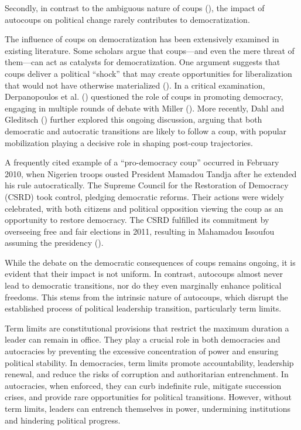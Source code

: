 \documentclass[
  12pt,
]{report}
\begin{document}
Secondly, in contrast to the ambiguous nature of coups
(), the impact of
autocoups on political change rarely contributes to democratization.

The influence of coups on democratization has been extensively examined
in existing literature. Some scholars argue that coups---and even the
mere threat of them---can act as catalysts for democratization. One
argument suggests that coups deliver a political ``shock'' that may
create opportunities for liberalization that would not have otherwise
materialized (). In
a critical examination, Derpanopoulos et al.
() questioned the role of coups in
promoting democracy, engaging in multiple rounds of debate with Miller
(). More recently, Dahl and Gleditsch
() further explored this ongoing
discussion, arguing that both democratic and autocratic transitions are
likely to follow a coup, with popular mobilization playing a decisive
role in shaping post-coup trajectories.

A frequently cited example of a ``pro-democracy coup'' occurred in
February 2010, when Nigerien troops ousted President Mamadou Tandja
after he extended his rule autocratically. The Supreme Council for the
Restoration of Democracy (CSRD) took control, pledging democratic
reforms. Their actions were widely celebrated, with both citizens and
political opposition viewing the coup as an opportunity to restore
democracy. The CSRD fulfilled its commitment by overseeing free and fair
elections in 2011, resulting in Mahamadou Issoufou assuming the
presidency ().

While the debate on the democratic consequences of coups remains
ongoing, it is evident that their impact is not uniform. In contrast,
autocoups almost never lead to democratic transitions, nor do they even
marginally enhance political freedoms. This stems from the intrinsic
nature of autocoups, which disrupt the established process of political
leadership transition, particularly term limits.

Term limits are constitutional provisions that restrict the maximum
duration a leader can remain in office. They play a crucial role in both
democracies and autocracies by preventing the excessive concentration of
power and ensuring political stability. In democracies, term limits
promote accountability, leadership renewal, and reduce the risks of
corruption and authoritarian entrenchment. In autocracies, when
enforced, they can curb indefinite rule, mitigate succession crises, and
provide rare opportunities for political transitions. However, without
term limits, leaders can entrench themselves in power, undermining
institutions and hindering political progress.
\end{document}
